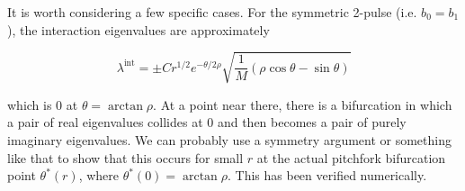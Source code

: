\documentclass[thesis.tex]{subfiles}
\begin{document}
It is worth considering a few specific cases. For the symmetric 2-pulse (i.e. $b_0 = b_1$), the interaction eigenvalues are approximately

\[
\lambda^{\text{int}} = \pm C r^{1/2} e^{-\theta/2\rho} \sqrt{ \frac{1}{M} \left( \rho \cos \theta - \sin \theta \right) }
\]

which is 0 at $\theta = \arctan \rho$. At a point near there, there is a bifurcation in which a pair of real eigenvalues collides at 0 and then becomes a pair of purely imaginary eigenvalues. We can probably use a symmetry argument or something like that to show that this occurs for small $r$ at the actual pitchfork bifurcation point $\theta^*(r)$, where $\theta^*(0) = \arctan \rho$. This has been verified numerically.



\end{document}
